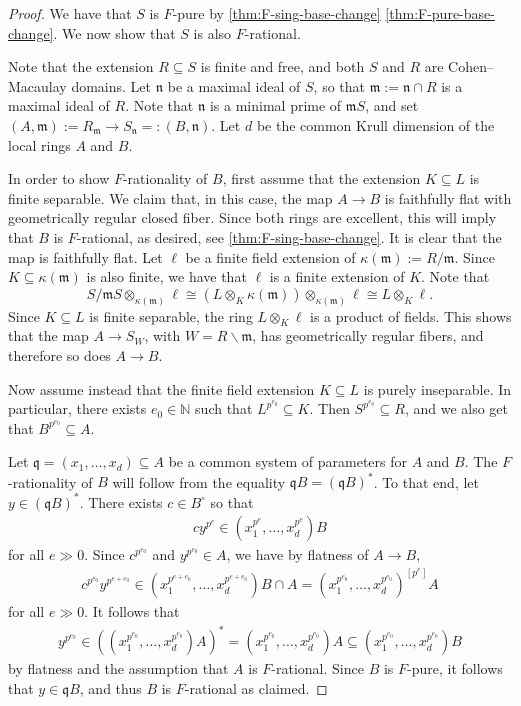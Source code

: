 \documentclass[reqno,11pt]{amsart}
\numberwithin{equation}{section}
\theoremstyle{definition}
\theoremstyle{definition}
\theoremstyle{definition}
\theoremstyle{remark}
\newcommand{\NN}{\mathbb{N}}
\newcommand{\fm}{\mathfrak{m}}
\newcommand{\fq}{\mathfrak{q}}
\newcommand{\fn}{\mathfrak{n}}
\begin{document}
\begin{proof}
We have that $S$ is $F$-pure by \cref{thm:F-sing-base-change} \ref{thm:F-pure-base-change}. We now show that $S$ is also $F$-rational.

    Note that the extension $R \subseteq S$ is finite and free, and both $S$ and $R$ are Cohen--Macaulay domains. Let $\fn$ be a maximal ideal of $S$, so that $\fm:=\fn \cap R$ is a maximal ideal of $R$. Note that $\fn$ is a minimal prime of $\fm S$, and set $(A,\fm):=R_\fm \to S_\fn=:(B,\fn)$. Let $d$ be the common Krull dimension of the local rings $A$ and $B$.
    
    In order to show $F$-rationality of $B$, first assume that the extension $K \subseteq L$ is finite separable. We claim that, in this case, the map $A \to B$ is faithfully flat with geometrically regular closed fiber. Since both rings are excellent, this will imply that $B$ is $F$-rational, as desired, see \cref{thm:F-sing-base-change}. It is clear that the map is faithfully flat.
    Let $\ell$ be a finite field extension of $\kappa(\fm):=R/\fm$. Since $K \subseteq \kappa(\fm)$ is also finite, we have that $\ell$ is a finite extension of $K$. Note that
    \[
    S/\fm S \otimes_{\kappa(\fm)} \ell \cong (L \otimes_K \kappa(\fm)) \otimes_{\kappa(\fm)} \ell \cong L \otimes_K \ell.
    \]
    Since $K \subseteq L$ is finite separable, the ring $L \otimes_K \ell$ is a product of fields. This shows that the map $A \to S_W$, with $W=R \smallsetminus \fm$, has geometrically regular fibers, and therefore so does $A \to B$.

    Now assume instead that the finite field extension $K \subseteq L$ is purely inseparable. In particular, there exists $e_{0}\in\NN$ such that $L^{p^{e_0}} \subseteq K$. Then $S^{p^{e_0}} \subseteq R$, and 
    we also get that $B^{p^{e_0}} \subseteq A$.
    
    Let $\fq = (x_1,\dots, x_d)\subseteq A$ be a common system of parameters for $A$ and $B$. The $F$-rationality of $B$ will follow from the equality $\fq B =(\fq B)^*$. To that end, let $y\in (\fq B)^*$. There exists $c\in B^{\circ}$ so that
    \begin{align*}
        cy^{p^e} \in (x_1^{p^e},\dots, x_d^{p^e})B
    \end{align*}
    for all $e\gg 0$. Since $c^{p^{e_0}}$ and $y^{p^{e_0}}\in A$, we have by flatness of $A\to B$,
    \begin{align*}
        c^{p^{e_0}} y^{p^{e+e_0}}\in (x_1^{p^{e+e_0}},\dots, x_d^{p^{e+e_0}})B \cap A = (x_1^{p^{e_0}},\ldots,x_d^{p^{e_0}})^{[p^e]}A
    \end{align*}
    for all $e\gg 0$. It follows that
    \begin{align*}
        y^{p^{e_0}}\in \left((x_1^{p^{e_0}},\dots, x_d^{p^{e_0}})A\right)^* = (x_1^{p^{e_0}},\dots, x_d^{p^{e_0}})A\subseteq (x_1^{p^{e_0}},\dots, x_d^{p^{e_0}})B
    \end{align*}
    by flatness and the assumption that $A$ is $F$-rational. Since $B$ is $F$-pure, it follows that $y\in \fq B$, and thus $B$ is $F$-rational as claimed. 
    

\end{proof}
\end{document}
